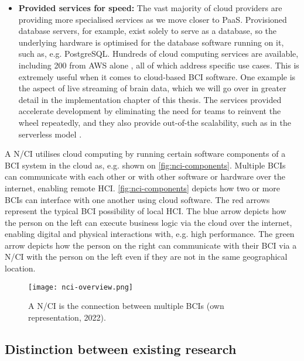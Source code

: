\begin{itemize}
  \item \textbf{Provided services for speed:} The vast majority of cloud providers are providing more specialised services as we move closer to PaaS. Provisioned database servers, for example, exist solely to serve as a database, so the underlying hardware is optimised for the database software running on it, such as, e.g. PostgreSQL. Hundreds of cloud computing services are available, including 200 from AWS alone \citep{amazon_web_services_inc_what_nodate}, all of which address specific use cases. This is extremely useful when it comes to cloud-based BCI software. One example is the aspect of live streaming of brain data, which we will go over in greater detail in the implementation chapter of this thesis. The services provided accelerate development by eliminating the need for teams to reinvent the wheel repeatedly, and they also provide out-of-the scalability, such as in the serverless model \citep{redhat_what_2022}.
\end{itemize}

A N/CI utilises cloud computing by running certain software components of a BCI system in the cloud as, e.g. shown on \autoref{fig:nci-components}. Multiple BCIs can communicate with each other or with other software or hardware over the internet, enabling remote HCI. \autoref{fig:nci-components} depicts how two or more BCIs can interface with one another using cloud software. The red arrows represent the typical BCI possibility of local HCI. The blue arrow depicts how the person on the left can execute business logic via the cloud over the internet, enabling digital and physical interactions with, e.g. high performance. The green arrow depicts how the person on the right can communicate with their BCI via a N/CI with the person on the left even if they are not in the same geographical location.

\begin{figure}[!ht]
  \centering
  \texttt{[image: nci-overview.png]}
  \caption{A N/CI is the connection between multiple BCIs (own representation, 2022).}
  \label{fig:nci-overview}
\end{figure}

\subsection{Distinction between existing research}
\label{chapter2-distinction-between-existing-research}

